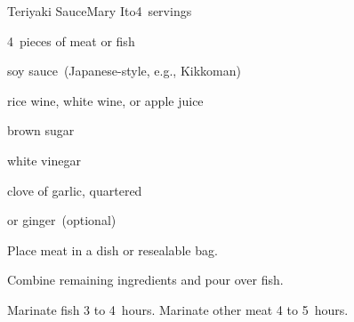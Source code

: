 \begin{recipe}{Teriyaki Sauce}{Mary Ito}{4~servings}

\begin{ingredients}
\item 4~pieces of meat or fish
\item \C{\half} soy sauce~(Japanese-style, e.g., Kikkoman)
\item \C{\third} rice wine, white wine, or apple juice
\item \C{\quarter} brown sugar
\item {} white vinegar
\item clove of garlic, quartered
\item {} or \tp{\half} ginger~(optional)
\end{ingredients}

\begin{directions}
\item Place meat in a dish or resealable bag.
\item Combine remaining ingredients and pour over fish.
\item Marinate fish 3 to 4~hours. Marinate other meat 4 to 5~hours.
\end{directions}

\end{recipe}
